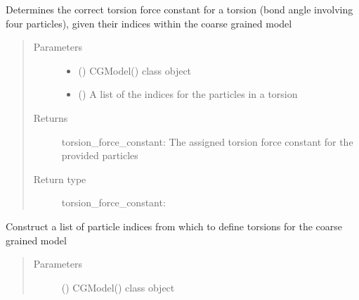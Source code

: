 \documentclass[letterpaper,12pt,english,openany,oneside]{sphinxmanual}
\begin{document}
\begin{fulllineitems}
\begin{fulllineitems}
\label{\detokenize{cg_model:cg_model.cgmodel.CGModel.get_torsion_force_constant}}
Determines the correct torsion force constant for a torsion (bond angle involving four particles), given their indices within the coarse grained model
\begin{quote}\begin{description}
\item[{Parameters}] \leavevmode\begin{itemize}
\item {} 
 () \textendash{} CGModel() class object

\item {} 
 (\sphinxstyleliteralemphasis{\sphinxupquote{( }}\sphinxstyleliteralemphasis{\sphinxupquote{ )}}) \textendash{} A list of the indices for the particles in a torsion

\end{itemize}

\item[{Returns}] \leavevmode
torsion\_force\_constant: The assigned torsion force constant for the provided particles

\item[{Return type}] \leavevmode

torsion\_force\_constant: 


\end{description}\end{quote}

\end{fulllineitems}


\begin{fulllineitems}
\label{\detokenize{cg_model:cg_model.cgmodel.CGModel.get_torsion_list}}
Construct a list of particle indices from which to define torsions for the coarse grained model
\begin{quote}\begin{description}
\item[{Parameters}] \leavevmode
{} () \textendash{} CGModel() class object


\end{description}
\end{quote}
\end{fulllineitems}
\end{fulllineitems}
\end{document}
